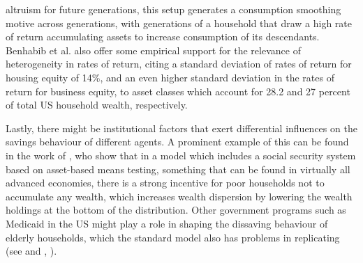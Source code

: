 altruism for future generations, this setup generates a consumption smoothing 
motive across generations, with generations of a household that draw a high 
rate of return accumulating assets to increase consumption of its descendants. 
Benhabib et al. also offer some empirical support for the relevance of 
heterogeneity in rates of return, citing a standard deviation of rates of return
for housing equity of 14\%, and an even higher standard deviation in the rates
of return for business equity, to asset classes which account for 28.2 and 27
percent of total US household wealth, respectively. 

Lastly, there might be institutional factors that exert differential influences
on the savings behaviour of different agents. A prominent example of this can
be found in the work of \citet{HubbardSkinnerZeldes1995}, who show that in a 
model which includes a social security system based on asset-based means 
testing, something that can be found in virtually all advanced economies, 
there is a strong incentive for poor households not to accumulate any wealth,
which increases wealth dispersion by lowering the wealth holdings at the bottom
of the distribution. Other government programs such as Medicaid in the US might
play a role in shaping the dissaving behaviour of elderly households, which the 
standard model also has problems in replicating (see \citet{DeNardiFrenchJones2009}
and \citeyear{DeNardiFrenchJones2010}, \citet{DeNardiFrenchJonesMcCauley2015}).  


